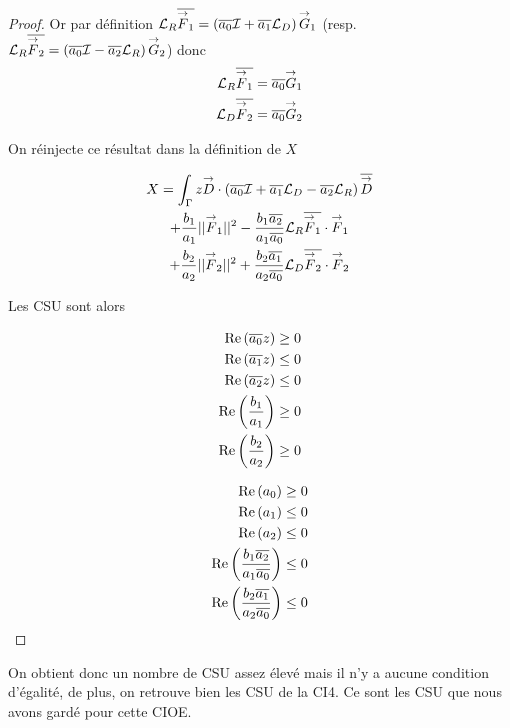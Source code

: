 \begin{proof}

    Or par définition \(\LR\conj{\vF_1} = \left(\conj{a_0} \oI + \conj{a_1} \LD \right)\vG_1\) (resp. \(\LR\conj{\vF_2} = \left(\conj{a_0} \oI - \conj{a_2} \LR \right)\vG_2\)) donc
    \begin{align}
      \LR\conj{\vF_1} &= \conj{a_0}\vG_1
      \\
      \LD\conj{\vF_2} &= \conj{a_0}\vG_2
    \end{align}

    On réinjecte ce résultat dans la définition de \(X\)

    \begin{multline}
      X = \int_\Gamma z \vD \cdot \left(\conj{a_0} \oI + \conj{a_1} \LD - \conj{a_2}\LR\right)\conj{\vD}
      \\
      + \frac{b_1}{a_1} ||\vF_1||^2 - \frac{b_1\conj{a_2}}{a_1\conj{a_0}} \LR\conj{\vF_1}\cdot\vF_1
      \\
      + \frac{b_2}{a_2} ||\vF_2||^2 + \frac{b_2\conj{a_1}}{a_2\conj{a_0}} \LD\conj{\vF_2}\cdot\vF_2
    \end{multline}

    Les CSU sont alors

    \begin{minipage}{0.5\textwidth}
    \begin{align}
      \Re\left(\conj{a_0}z\right) \ge 0
      \\
      \Re\left(\conj{a_1}z\right) \le 0
      \\
      \Re\left(\conj{a_2}z\right) \le 0
      \\
      \Re\left(\frac{b_1}{a_1}\right) \ge 0
      \\
      \Re\left(\frac{b_2}{a_2}\right) \ge 0
    \end{align}
    \end{minipage}
    \begin{minipage}{0.49\textwidth}
    \begin{align}
      \Re\left(a_0\right) \ge 0
      \\
      \Re\left(a_1\right) \le 0
      \\
      \Re\left(a_2\right) \le 0
      \\
      \Re\left(\frac{b_1\conj{a_2}}{a_1\conj{a_0}}\right) \le 0
      \\
      \Re\left(\frac{b_2\conj{a_1}}{a_2\conj{a_0}}\right) \le 0
    \end{align}
    \end{minipage}
  \end{proof}

  On obtient donc un nombre de CSU assez élevé mais il n'y a aucune condition d'égalité, de plus, on retrouve bien les CSU de la CI4. Ce sont les CSU que nous avons gardé pour cette CIOE.
